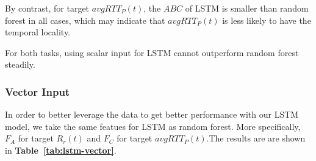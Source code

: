 \documentclass[sigconf]{acmart}
\begin{document}
	By contrast, for target $avgRTT_P(t)$, the $ABC$ of LSTM is smaller than random forest in all cases, which may indicate that $avgRTT_P(t)$ is less likely to have the temporal locality.
	
	For both tasks, using scalar input for LSTM cannot outperform random forest steadily.
	
	\subsubsection{Vector Input}
	In order to better leverage the data to get better performance with our LSTM model, we take the same featues for LSTM as random forest. More specifically, $F_A$ for target $R_r(t)$ and $F_C$ for target $avgRTT_P(t)$.The results are are shown in \textbf{Table~\ref{tab:lstm-vector}}.
	
\end{document}
